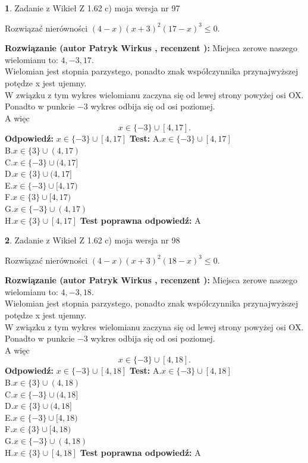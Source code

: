 \documentclass[12pt, a4paper]{article}
\theoremstyle{definition} %
\newtheorem{zad}{}
\newcommand{\zadStart}[1]{\begin{zad}#1\newline}
\newcommand{\zadStop}{\end{zad}}
\newcommand{\rozwStart}[2]{\noindent \textbf{Rozwiązanie (autor #1 , recenzent #2): }\newline}
\newcommand{\rozwStop}{\newline}
\newcommand{\odpStart}{\noindent \textbf{Odpowiedź:}\newline}
\newcommand{\odpStop}{\newline}
\newcommand{\testStart}{\noindent \textbf{Test:}\newline}
\newcommand{\testStop}{\newline}
\newcommand{\kluczStart}{\noindent \textbf{Test poprawna odpowiedź:}\newline}
\newcommand{\kluczStop}{\newline}
\begin{document}
\zadStart{Zadanie z Wikieł Z 1.62 c) moja wersja nr 97}

Rozwiązać nierówności $(4-x)(x+3)^{2}(17-x)^{3}\le0$.
\zadStop
\rozwStart{Patryk Wirkus}{}
Miejsca zerowe naszego wielomianu to: $4, -3, 17$.\\
Wielomian jest stopnia parzystego, ponadto znak współczynnika przy\linebreak najwyższej potędze x jest ujemny.\\ W związku z tym wykres wielomianu zaczyna się od lewej strony powyżej osi OX.\\
Ponadto w punkcie $-3$ wykres odbija się od osi poziomej.\\
A więc $$x \in \{-3\} \cup [4,17].$$
\rozwStop
\odpStart
$x \in \{-3\} \cup [4,17]$
\odpStop
\testStart
A.$x \in \{-3\} \cup [4,17]$\\
B.$x \in \{3\} \cup (4,17)$\\
C.$x \in \{-3\} \cup (4,17]$\\
D.$x \in \{3\} \cup (4,17]$\\
E.$x \in \{-3\} \cup [4,17)$\\
F.$x \in \{3\} \cup [4,17)$\\
G.$x \in \{-3\} \cup (4,17)$\\
H.$x \in \{3\} \cup [4,17]$
\testStop
\kluczStart
A
\kluczStop



\zadStart{Zadanie z Wikieł Z 1.62 c) moja wersja nr 98}

Rozwiązać nierówności $(4-x)(x+3)^{2}(18-x)^{3}\le0$.
\zadStop
\rozwStart{Patryk Wirkus}{}
Miejsca zerowe naszego wielomianu to: $4, -3, 18$.\\
Wielomian jest stopnia parzystego, ponadto znak współczynnika przy\linebreak najwyższej potędze x jest ujemny.\\ W związku z tym wykres wielomianu zaczyna się od lewej strony powyżej osi OX.\\
Ponadto w punkcie $-3$ wykres odbija się od osi poziomej.\\
A więc $$x \in \{-3\} \cup [4,18].$$
\rozwStop
\odpStart
$x \in \{-3\} \cup [4,18]$
\odpStop
\testStart
A.$x \in \{-3\} \cup [4,18]$\\
B.$x \in \{3\} \cup (4,18)$\\
C.$x \in \{-3\} \cup (4,18]$\\
D.$x \in \{3\} \cup (4,18]$\\
E.$x \in \{-3\} \cup [4,18)$\\
F.$x \in \{3\} \cup [4,18)$\\
G.$x \in \{-3\} \cup (4,18)$\\
H.$x \in \{3\} \cup [4,18]$
\testStop
\kluczStart
A
\kluczStop
\end{document}
